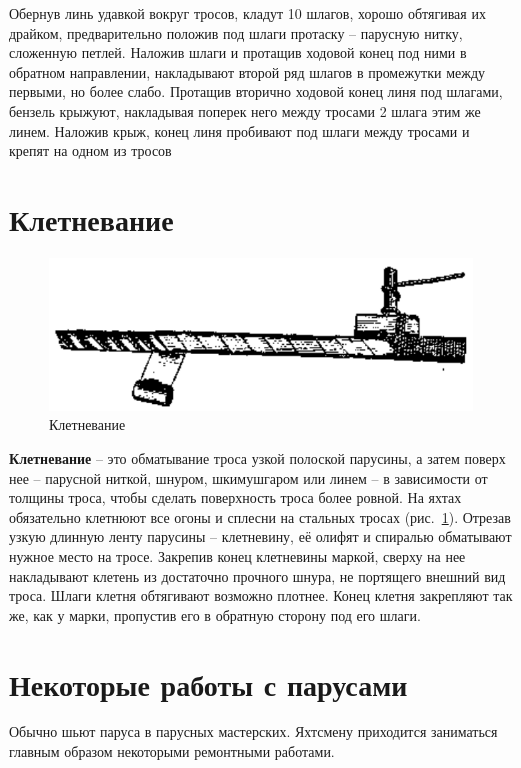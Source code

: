\documentclass[a4paper, 12pt, twoside, final]{scrbook}
\begin{document}
Обернув линь удавкой вокруг тросов, кладут 10 шлагов, хорошо обтягивая их драйком, предварительно положив под шлаги протаску \--- парусную нитку, сложенную петлей. Наложив шлаги и протащив ходовой конец под ними в обратном направлении, накладывают второй ряд шлагов в промежутки между первыми, но более слабо. Протащив вторично ходовой конец линя под шлагами, бензель крыжуют, накладывая поперек него между тросами 2 шлага этим же линем. Наложив крыж, конец линя пробивают под шлаги между тросами и крепят на одном из тросов 

\section{Клетневание}

\begin{figure}[htbp]
   \centering
   \includegraphics{pics/71_Kletnevanie} %
   \caption{Клетневание}
   \label{fig:71}
\end{figure}

\textbf{Клетневание} \--- это обматывание троса узкой полоской парусины, а затем поверх нее \--- парусной ниткой, шнуром, шкимушгаром или линем \--- в зависимости от толщины троса, чтобы сделать поверхность троса более ровной. На яхтах обязательно клетнюют все огоны и сплесни на стальных тросах (рис.~\ref{fig:71}).
Отрезав узкую длинную ленту парусины \--- клетневину, её олифят и спиралью обматывают нужное место на тросе. Закрепив конец клетневины маркой, сверху на нее накладывают клетень из достаточно прочного шнура, не портящего внешний вид троса. Шлаги клетня обтягивают возможно плотнее. Конец клетня закрепляют так же, как у марки, пропустив его в обратную сторону под его шлаги.

\section{Некоторые работы с парусами}

Обычно шьют паруса в парусных мастерских. Яхтсмену приходится заниматься главным образом некоторыми ремонтными работами.
\end{document}
